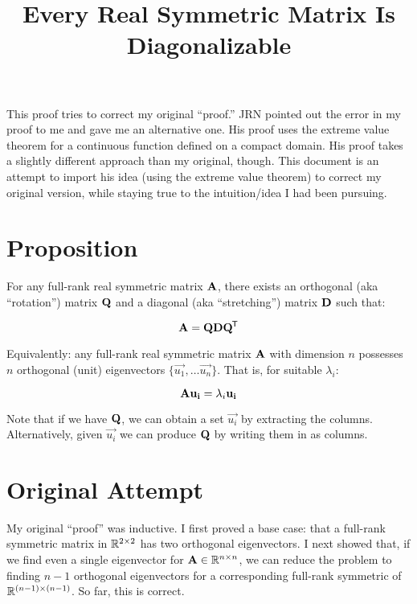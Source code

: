 \documentclass[11pt, oneside]{amsart}
\begin{document}
\title{Every Real Symmetric Matrix Is Diagonalizable}
\maketitle

This proof tries to correct my original ``proof.'' JRN pointed out the
error in my proof to me and gave me an alternative one. His proof uses
the extreme value theorem for a continuous function defined on a compact
domain. His proof takes a slightly different approach than my original,
though. This document is an attempt to import his idea (using the
extreme value theorem) to correct my original version, while staying
true to the intuition/idea I had been pursuing.

\section{Proposition}

\begin{theorem}
  For any full-rank real symmetric matrix $\mathbf{A}$, there exists an
  orthogonal (aka ``rotation'') matrix $\mathbf{Q}$ and a diagonal (aka
  ``stretching'') matrix $\mathbf{D}$ such that:

  \[
    \mathbf{A} = \mathbf{Q} \mathbf{D} \mathbf{Q}^{\mkern-1.5mu\mathsf{T}}
  \]

  Equivalently: any full-rank real symmetric matrix $\mathbf{A}$ with
  dimension $n$ possesses $n$ orthogonal (unit) eigenvectors $\{
  \vec{u_1}, \ldots \vec{u_n} \}$. That is, for suitable $\lambda_i$:

  \[
    \mathbf{A} \mathbf{u_i} = \lambda_i \mathbf{u_i}
  \]

  Note that if we have $\mathbf{Q}$, we can obtain a set $\vec{u_i}$ by
  extracting the columns. Alternatively, given $\vec{u_i}$ we can
  produce $\mathbf{Q}$ by writing them in as columns.
\end{theorem}

\section{Original Attempt}

My original ``proof'' was inductive. I first proved a base case: that a
full-rank symmetric matrix in $\mathbb{R}^{2 \times 2}$ has two orthogonal
eigenvectors. I next showed that, if we find even a single eigenvector
for $\mathbf{A} \in \mathbb{R}^{n \times n}$, we can reduce the problem to finding $n-1$
orthogonal eigenvectors for a corresponding full-rank symmetric of
$\mathbb{R}^{(n-1) \times (n-1)}$. So far, this is correct.
\end{document}
